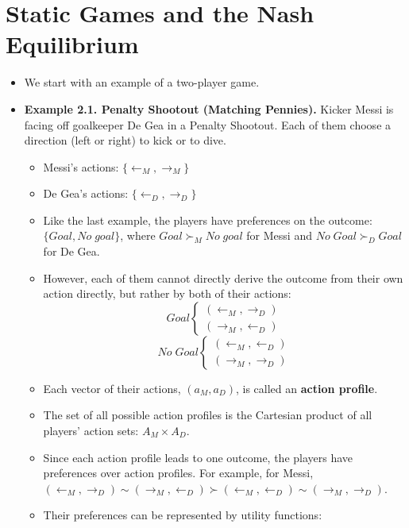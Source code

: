 \documentclass[notitlepage]{article}
\begin{document}
\section{Static Games and the Nash Equilibrium}

\begin{itemize}
    \item We start with an example of a two-player game.
    \item \textbf{Example 2.1. Penalty Shootout (Matching Pennies).} Kicker Messi is facing off goalkeeper De Gea in a Penalty Shootout. Each of them choose a direction (left or right) to kick or to dive.
    \begin{itemize}
        \item Messi's actions: \(\{\leftarrow_M, \rightarrow_M\}\)
        \item De Gea's actions: \(\{\leftarrow_D, \rightarrow_D\}\)
        \item Like the last example, the players have preferences on the outcome: \(\{Goal, No \;goal\}\), where \(Goal \succ_M No \;goal\) for Messi and \(No \;Goal \succ_D Goal\) for De Gea.
        \item However, each of them cannot directly derive the outcome from their own action directly, but rather by both of their actions:
        \[
        Goal 
        \begin{cases}
            (\leftarrow_M, \rightarrow_D) \\
            (\rightarrow_M, \leftarrow_D)
        \end{cases}
        \]
        \[
        No\;Goal 
        \begin{cases}
            (\leftarrow_M, \leftarrow_D) \\
            (\rightarrow_M, \rightarrow_D)
        \end{cases}
        \]
        \item Each vector of their actions, \((a_M, a_D)\), is called an \textbf{action profile}.
        \item The set of all possible action profiles is the Cartesian product of all players' action sets: \(A_M \times A_D\).
        \item Since each action profile leads to one outcome, the players have preferences over action profiles. For example, for Messi, \((\leftarrow_M, \rightarrow_D) \sim (\rightarrow_M, \leftarrow_D) \succ (\leftarrow_M, \leftarrow_D) \sim (\rightarrow_M, \rightarrow_D)\).
        \item Their preferences can be represented by utility functions:


\end{itemize}
\end{itemize}
\end{document}
